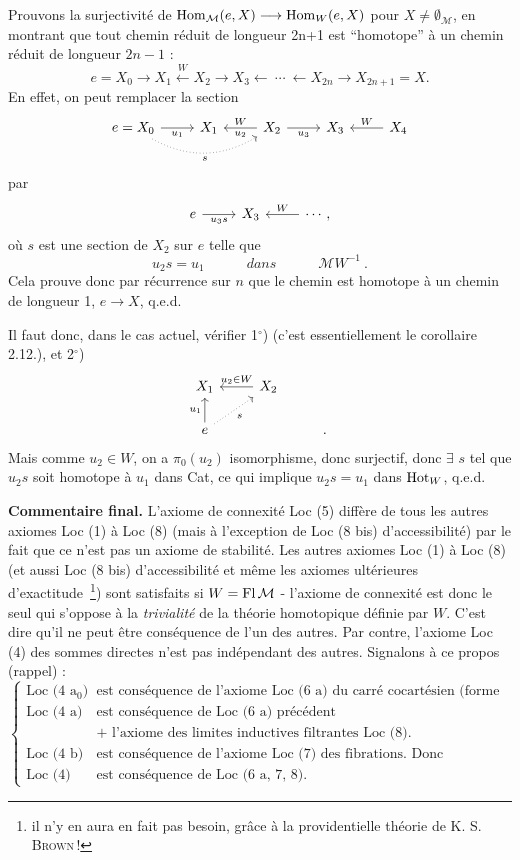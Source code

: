 Prouvons la surjectivité de $\operatorname{Hom}_{\mathcal{M}}(e,X)\longrightarrow\operatorname{Hom}_W(e,X)$ pour $X\neq\emptyset_{\mathcal{M}}$, en montrant que tout chemin réduit de longueur 2n+1 est “homotope” à un chemin réduit de longueur $2n-1$ :
\[
e=X_0\longrightarrow X_1\xleftarrow{\ W\ }X_2\longrightarrow X_3\longleftarrow\ \cdots\ \longleftarrow X_{2n}\longrightarrow X_{2n+1}=X.
\]
En effet, on peut remplacer la section
\[
\begin{tikzcd}
e=X_0 \arrow[r,"u_1"'] \arrow[rr,dotted,bend right,"s"'] & X_1 & X_2 \arrow[l,"W"',"u_2"] \arrow[r,"u_3"'] & X_3 & X_4 \arrow[l,"W"']
\end{tikzcd}
\]
par
\[
\begin{tikzcd}
e \arrow[r,"u_3s"'] & X_3 & \cdots, \arrow[l,"W"']
\end{tikzcd}
\]
où $s$ est une section de $X_2$ sur $e$ telle que
\[
u_2s=u_1\qquad\quad\textit{dans}\qquad\quad\mathcal{M}W^{-1}\ .
\]
Cela prouve donc par récurrence sur $n$ que le chemin est homotope à un chemin de longueur 1, $e\longrightarrow X$, q.e.d.

Il faut donc, dans le cas actuel, vérifier 1$^{\circ}$) (c'est essentiellement le corollaire 2.12.), et 2$^{\circ}$)
\[
\begin{tikzcd}
X_1 & X_2 \arrow[l,"u_2\in W"'] & \\
e \arrow[u,"u_1"] \arrow[ur,dotted,"s"'] & & .
\end{tikzcd}
\]
Mais comme $u_2\in W$, on a $\pi_0(u_2)$ isomorphisme, donc
surjectif, donc $\exists$ $s$ tel que $u_2s$ soit homotope à $u_1$ dans Cat, ce qui implique $u_2s=u_1$ dans $\mathrm{Hot}_W$, q.e.d.

\textbf{Commentaire final.} L'axiome de connexité Loc (5) diffère de tous les autres axiomes Loc (1) à Loc (8) (mais à l'exception de Loc (8 bis) d'accessibilité) par le fait que ce n'est pas un axiome de stabilité. Les autres axiomes Loc (1) à Loc (8) (et aussi Loc (8 bis) d'accessibilité et même les axiomes ultérieures %
d'exactitude~\footnote[7]{il n'y en aura en fait pas besoin, grâce à la providentielle théorie de K. S. \textsc{Brown}\,!}) sont satisfaits si $W=\operatorname{Fl}\mathcal{M}$ - l'axiome de connexité est donc le seul qui s'oppose à la \textit{trivialité} de la théorie homotopique définie par $W$. C'est dire qu'il ne peut être conséquence de l'un des autres. Par contre, l'axiome Loc (4) des sommes directes n'est pas indépendant des autres. Signalons à ce propos (rappel) :
\[
\left\{
\begin{array}{rl}
\text{Loc (4 a$_0$)} & \text{est conséquence de l'axiome Loc (6 a) du carré cocartésien (forme directe).}\\[1ex]
\text{Loc (4 a)} & \text{est conséquence de Loc (6 a) précédent}\\
 & \text{+ l'axiome des limites inductives filtrantes Loc (8).}\\[3ex]
\text{Loc (4 b)} & \text{est conséquence de l'axiome Loc (7) des fibrations. Donc}\\[1ex]
\text{Loc (4)} & \text{est conséquence de Loc (6 a, 7, 8).}
\end{array}
\right.
\]


